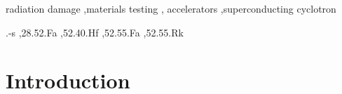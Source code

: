 \documentclass[final,3p,times,twocolumn]{elsarticle} %
\begin{document}
\begin{frontmatter}
\begin{abstract}
\end{abstract}

\begin{keyword}

radiation damage \sep materials testing \sep
accelerators \sep superconducting cyclotron

.-s \sep 28.52.Fa \sep 52.40.Hf \sep 52.55.Fa \sep 52.55.Rk
\end{keyword}

\end{frontmatter}

\section{Introduction}



	
	
\end{document}
